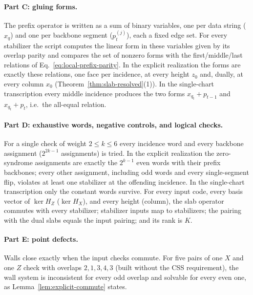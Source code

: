 \documentclass[aps,prx,reprint,superscriptaddress,nofootinbib,floatfix,longbibliography]{revtex4-2}
\theoremstyle{definition}
\begin{document}
\paragraph{Part C: gluing forms.}
The prefix operator is written as a sum of binary variables, one per data
string ($x_q$) and one per backbone segment ($p^{(j)}_t$), each a fixed edge
set.  For every stabilizer the script computes the linear form in these
variables given by its overlap parity and compares the set of nonzero forms
with the first/middle/last relations of Eq.~\eqref{eq:local-prefix-parity}.
In the explicit realization the forms are exactly these relations, one face
per incidence, at every height $z_0$ and, dually, at every column $x_0$
(Theorem~\ref{thm:slab-resolved}(1)).  In the single-chart transcription every
middle incidence produces the two forms $x_{q_t}+p_{t-1}$ and $x_{q_t}+p_t$,
i.e.\ the all-equal relation.

\paragraph{Part D: exhaustive words, negative controls, and logical checks.}
For a single check of weight $2\le k\le6$ every incidence word and every
backbone assignment ($2^{2k-1}$ assignments) is tried.  In the explicit
realization the zero-syndrome assignments are exactly the $2^{k-1}$ even words
with their prefix backbones; every other assignment, including odd words and
every single-segment flip, violates at least one stabilizer at the
offending incidence.  In the single-chart transcription only the constant
words survive.  For every input code, every basis vector of $\ker H_Z$
($\ker H_X$), and every height (column), the slab operator commutes with every
stabilizer; stabilizer inputs map to stabilizers; the pairing with the dual
slabs equals the input pairing; and its rank is $K$.

\paragraph{Part E: point defects.}
Walls close exactly when the input checks commute.  For five pairs of one
$X$ and one $Z$ check with overlaps $2,1,3,4,3$ (built without the CSS
requirement), the wall system is inconsistent for every odd overlap and
solvable for every even one, as Lemma~\ref{lem:explicit-commute} states.
\end{document}
